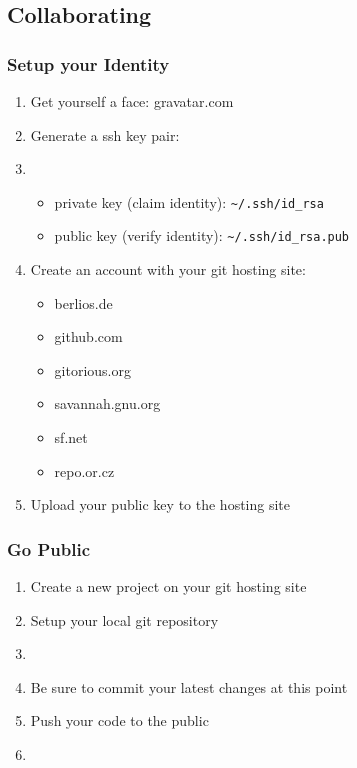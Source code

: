 \subsection{Collaborating}

\begin{slide}[fragile]
  \frametitle{Setup your Identity}
  \begin{enumerate}
    \item Get yourself a face: gravatar.com
    \item Generate a ssh key pair:
    \item[]
    \begin{itemize}
      \item private key (claim identity): \verb+~/.ssh/id_rsa+
      \item public key (verify identity): \verb+~/.ssh/id_rsa.pub+
    \end{itemize}
    \item Create an account with your git hosting site:
      \begin{itemize}
        \item berlios.de
        \item github.com
        \item gitorious.org
        \item savannah.gnu.org
        \item sf.net
        \item repo.or.cz
      \end{itemize}
    \item Upload your public key to the hosting site
  \end{enumerate}
\end{slide}

\begin{slide}[fragile]
  \frametitle{Go Public}
  \begin{enumerate}
    \item Create a new project on your git hosting site
    \item Setup your local git repository
    \item[]
    \item Be sure to commit your latest changes at this point
    \item Push your code to the public
    \item[]
  \end{enumerate}
\end{slide}

